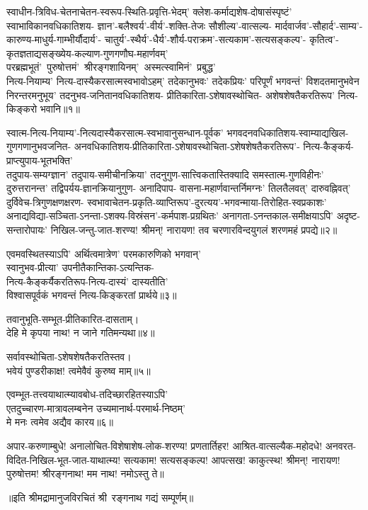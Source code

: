 
\begin{flushleft}
स्वाधीन-त्रिविध-चेतनाचेतन-स्वरूप-स्थिति-प्रवृत्ति-भेदम्'
क्लेश-कर्माद्यशेष-दोषासंस्पृष्टं' स्वाभाविकानवधिकातिशय-
ज्ञान'-बलैश्वर्य'-वीर्य'-शक्ति-तेजः सौशील्य'-वात्सल्य-
मार्दवार्जव'-सौहार्द'-साम्य'-कारुण्य-माधुर्य-गाम्भीर्यौदार्य'-
चातुर्य'-स्थैर्य'-धैर्य'-शौर्य-पराक्रम'-सत्यकाम'-सत्यसङ्कल्प'-
कृतित्व'-कृतज्ञताद्यसङ्ख्येय-कल्याण-गुणगणौघ-महार्णवम्'
\mbox{परब्रह्मभूतं' पुरुषोत्तमं' श्रीरङ्गशायिनम्' अस्मत्स्वामिनं' प्रबुद्ध'}\\
नित्य-नियाम्य' नित्य-दास्यैकरसात्मस्वभावोऽहम्'
तदेकानुभवः' तदेकप्रियः' परिपूर्णं भगवन्तं'
विशदतमानुभवेन निरन्तरमनुभूय' तदनुभव-जनितानवधिकातिशय-%
प्रीतिकारिता-ऽशेषावस्थोचित-
अशेषशेषतैकरतिरूप' नित्य-किङ्करो भवानि॥१॥


स्वात्म-नित्य-नियाम्य'-नित्यदास्यैकरसात्म-स्वभावानुसन्धान-पूर्वक'
भगवदनवधिकातिशय-स्वाम्याद्यखिल-गुणगणानुभवजनित-
अनवधिकातिशय-प्रीतिकारिता-ऽशेषावस्थोचिता-ऽशेषशेषतैकरतिरूप'-%
नित्य-कैङ्कर्य-प्राप्त्युपाय-भूतभक्ति'\\
तदुपाय-सम्यग्ज्ञान' तदुपाय-समीचीनक्रिया'
तदनुगुण-सात्त्विकतास्तिक्यादि समस्तात्म-गुणविहीनः'
दुरुत्तरानन्त' तद्विपर्यय-ज्ञानक्रियानुगुण-%
अनादिपाप- वासना-महार्णवान्तर्निमग्नः'
तिलतैलवत्' दारुवह्निवत्' दुर्विवेच-त्रिगुणक्षणक्षरण-%
स्वभावाचेतन-प्रकृति-व्याप्तिरूप'-दुरत्यय'-भगवन्माया-तिरोहित-स्वप्रकाशः'
अनाद्यविद्या-सञ्चिता-ऽनन्ता-ऽशक्य-विस्रंसन'-कर्मपाश-प्रग्रथितः'
अनागता-ऽनन्तकाल-समीक्षयाऽपि' अदृष्ट-सन्तारोपायः'
निखिल-जन्तु-जात-शरण्य! श्रीमन्! नारायण!
तव चरणारविन्दयुगलं शरणमहं प्रपद्ये॥२॥

एवमवस्थितस्याऽपि' अर्थित्वमात्रेण' परमकारुणिको भगवान्'\\
स्वानुभव-प्रीत्या' उपनीतैकान्तिका-ऽत्यन्तिक-\\
नित्य-कैङ्कर्यैकरतिरूप-नित्य-दास्यं' दास्यतीति' \\
विश्वासपूर्वकं भगवन्तं नित्य-किङ्करतां प्रार्थये॥३॥

तवानुभूति-सम्भूत-प्रीतिकारित-दासताम्।\\
देहि मे कृपया नाथ! न जाने गतिमन्यथा॥४॥

सर्वावस्थोचिता-ऽशेषशेषतैकरतिस्तव।\\
भवेयं पुण्डरीकाक्ष! त्वमेवैवं कुरुष्व माम्॥५॥

एवम्भूत-तत्त्वयाथात्म्यावबोध-तदिच्छारहितस्याऽपि'\\
एतदुच्चारण-मात्रावलम्बनेन उच्यमानार्थ-परमार्थ-निष्ठम्'\\
मे मनः त्वमेव अद्यैव कारय॥६॥

अपार-करुणाम्बुधे! अनालोचित-विशेषाशेष-लोक-शरण्य!
प्रणतार्तिहर! आश्रित-वात्सल्यैक-महोदधे! 
अनवरत-विदित-निखिल-भूत-जात-याथात्म्य!
सत्यकाम! सत्यसङ्कल्प! आपत्सख! काकुत्स्थ! श्रीमन्!
नारायण! पुरुषोत्तम! श्रीरङ्गनाथ! मम नाथ! नमोऽस्तु ते॥
\end{flushleft}
\centerline{॥इति श्रीमद्रामानुजविरचितं श्री~रङ्गनाथ गद्यं सम्पूर्णम्॥}
